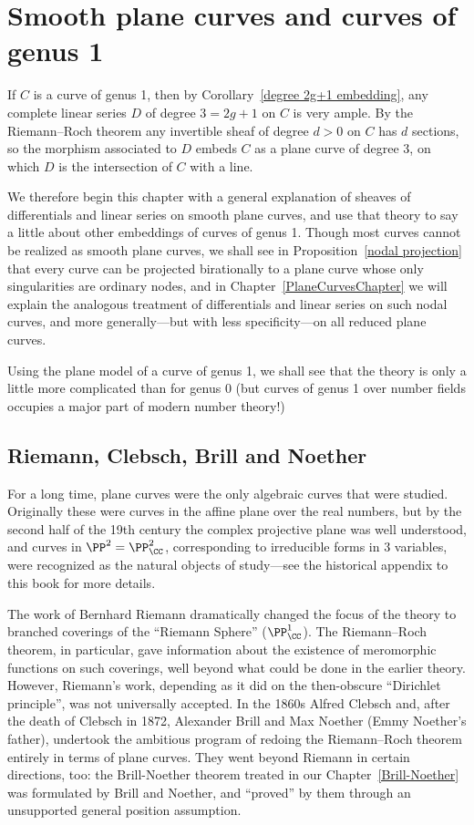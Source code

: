 

\chapter{Smooth plane curves and curves of genus 1}\label{3b}\label{genus 1 chapter}

If $C$ is a curve of genus 1, then by Corollary~\ref{degree 2g+1 embedding}, any complete linear series $D$ of
degree $3 = 2g+1$ on $C$ is very ample. By the Riemann--Roch theorem any invertible sheaf
of degree $d>0$ on $C$ has $d$ sections, so the morphism associated to $D$ embeds $C$
as a plane curve of degree 3, on which $D$ is the intersection of $C$ with a line. 

We therefore begin this chapter with a general explanation of sheaves of differentials and linear
series on smooth plane curves, and use that theory to say a little about other embeddings of 
curves of genus 1. Though most curves cannot be realized as smooth plane curves, we shall see
in Proposition~\ref{nodal projection} that every curve can be projected birationally to a plane curve whose only singularities are ordinary nodes, and in Chapter~\ref{PlaneCurvesChapter} we will
explain the analogous treatment of differentials and linear series on such nodal curves, and more
generally---but with less specificity---on all reduced plane curves.

Using the plane model of a curve of genus 1, we shall see  that the theory  is only a little more complicated than for genus 0 (but curves of genus 1 over number fields occupies a major part of modern number theory!)  


\section{Riemann, Clebsch, Brill and Noether}
For a long time, plane curves were the only algebraic curves that were studied. Originally these were curves in the affine plane over the real numbers, but by the second half of the 19th century the complex projective plane was well understood, and curves in $\PP^2 = \PP^2_\CC$, corresponding to irreducible forms in 3 variables, were recognized as the natural objects of study---see the historical appendix to this book for more details.

The work of Bernhard Riemann dramatically changed the focus of the theory to branched coverings of   the ``Riemann Sphere'' ($\PP^1_\CC$). The Riemann--Roch theorem, in particular, gave information about the existence of meromorphic functions on such coverings, well beyond what could be done in the earlier theory. However, Riemann's work, depending as it did on the then-obscure ``Dirichlet principle'', was not universally accepted. In the 1860s Alfred Clebsch and, after the death of Clebsch  in 1872, Alexander Brill and Max Noether (Emmy Noether's father), undertook the ambitious program of redoing the Riemann--Roch theorem entirely in terms of plane curves. They went beyond Riemann in certain directions, too: the Brill-Noether theorem treated in our Chapter~\ref{Brill-Noether} was formulated by Brill and Noether, and ``proved'' by them through an unsupported general position assumption. 

